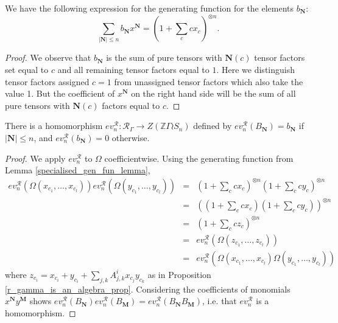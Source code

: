 \documentclass[ALCO,Unicode]{cedram}
\newcommand{\RGamma}{\mathcal{R}_{\Gamma}}
\newcommand{\RGamma}{\mathcal{R}_{\Gamma}}
\begin{document}
\begin{lemma} \label{specialised_gen_fun_lemma}
We have the following expression for the generating function for the elements $b_{\mathbf{N}}$:
\[
\sum_{|\mathbf{N}| \leq n} b_{\mathbf{N}} x^{\mathbf{N}} = (1 + \sum_c c x_c)^{\otimes n}.
\]
\end{lemma}

\begin{proof}
We observe that $b_{\mathbf{N}}$ is the sum of pure tensors with $\mathbf{N}(c)$ tensor factors set equal to $c$ and all remaining tensor factors equal to $1$. Here we distinguish tensor factors assigned $c=1$ from unassigned tensor factors which also take the value 1. But the coefficient of $x^{\mathbf{N}}$ on the right hand side will be the sum of all pure tensors with $\mathbf{N}(c)$ factors equal to $c$. 
\end{proof}


\begin{theorem} \label{r_gamma_hom_thm}
There is a homomorphism $ev_n^{\mathcal{R}}: \RGamma \to Z(\mathbb{Z} \Gamma \wr S_n)$ defined by $ev_n^{\mathcal{R}}(B_{\mathbf{N}}) = b_{\mathbf{N}}$ if $|\mathbf{N}| \leq n$, and $ev_n^{\mathcal{R}}(b_{\mathbf{N}}) = 0$ otherwise.
\end{theorem}

\begin{proof}
We apply $ev_n^{\mathcal{R}}$ to $\Omega$ coefficientwise.
Using the generating function from Lemma \ref{specialised_gen_fun_lemma},
\begin{eqnarray*}
ev_n^{\mathcal{R}}(\Omega(x_{c_1}, \ldots, x_{c_l}))ev_n^{\mathcal{R}}( \Omega(y_{c_1}, \ldots, y_{c_l})) &=& 
(1 + \sum_c cx_c)^{\otimes n} (1 + \sum_c c y_c)^{\otimes n} \\
&=& ((1 + \sum_c cx_c)(1 + \sum_c c y_c))^{\otimes n} \\
&=& (1 + \sum_c c z_c)^{\otimes n} \\
&=& ev_n^{\mathcal{R}}(\Omega(z_{c_1}, \ldots, z_{c_l})) \\
&=& ev_n^{\mathcal{R}}(\Omega(x_{c_1}, \ldots, x_{c_l})\Omega(y_{c_1}, \ldots, y_{c_l}))
\end{eqnarray*}
where $z_{c_i} = x_{c_i} + y_{c_i} + \sum_{j,k}A_{j,k}^{i} x_{c_j} y_{c_k}$ as in Proposition \ref{r_gamma_is_an_algebra_prop}. Considering the coefficients of monomials $x^{\mathbf{N}}y^{\mathbf{M}}$ shows $ev_n^{\mathcal{R}}(B_{\mathbf{N}})ev_n^{\mathcal{R}}(B_{\mathbf{M}}) = ev_n^{\mathcal{R}}(B_{\mathbf{N}}B_{\mathbf{M}})$, i.e. that $ev_n^{\mathcal{R}}$ is a homomorphism.
\end{proof}
\end{document}
